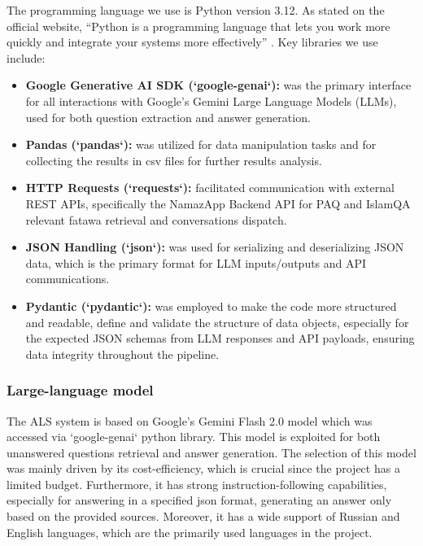 The programming language we use is Python version 3.12. As stated on the official website, “Python is a programming language that lets you work more quickly and integrate your systems more effectively” \cite{pythonwebsite}.
Key libraries we use include:
\begin{itemize}
    \item \textbf{Google Generative AI SDK (`google-genai`):} \cite{googlegenai} was the primary interface for all interactions with Google's Gemini Large Language Models (LLMs), used for both question extraction and answer generation.
    \item \textbf{Pandas (`pandas`):} \cite{pandas} was utilized for data manipulation tasks and for collecting the results in csv files for further results analysis.
    \item \textbf{HTTP Requests (`requests`):} \cite{requests} facilitated communication with external REST APIs, specifically the NamazApp Backend API for PAQ and IslamQA relevant fatawa retrieval and conversations dispatch.
    \item \textbf{JSON Handling (`json`):} \cite{json} was used for serializing and deserializing JSON data, which is the primary format for LLM inputs/outputs and API communications.
    \item \textbf{Pydantic (`pydantic`):} \cite{pydantic} was employed to make the code more structured and readable, define and validate the structure of data objects, especially for the expected JSON schemas from LLM responses and API payloads, ensuring data integrity throughout the pipeline.
\end{itemize}

\subsubsection{Large-language model}

The ALS system is based on Google's Gemini Flash 2.0 model \cite{gemini_flash_2} which was accessed via `google-genai` python library. This model is exploited for both unanswered questions retrieval and answer generation. The selection of this model was mainly driven by its cost-efficiency, which is crucial since the project has a limited budget. Furthermore, it has strong instruction-following capabilities, especially for answering in a specified json format, generating an answer only based on the provided sources. Moreover, it has a wide support of Russian and English languages, which are the primarily used languages in the project.

